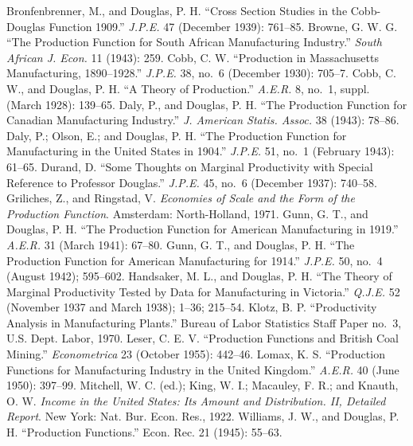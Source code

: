 \documentclass{article}
\begin{document}
\begin{thebibliography}{00}
Bronfenbrenner, M., and Douglas, P. H. \foreignlanguage{english}{``Cross Section Studies in the Cobb-Douglas Function 1909.'' \emph{J.P.E.} 47 (December 1939): 761--85.}
Browne, G. W. G. \foreignlanguage{english}{``The Production Function for South African Manufacturing Industry.'' \emph{South African J. Econ.} 11 (1943): 259.}
Cobb, C. W. \foreignlanguage{english}{``Production in Massachusetts Manufacturing, 1890--1928.'' \emph{J.P.E.} 38, no.~6 (December 1930): 705--7.}
Cobb, C. W., and Douglas, P. H. \foreignlanguage{english}{``A Theory of Production.'' \emph{A.E.R.} 8, no.~1, suppl. (March 1928): 139--65.}
Daly, P., and Douglas, P. H. \foreignlanguage{english}{``The Production Function for Canadian Manufacturing Industry.'' \emph{J. American Statis. Assoc.} 38 (1943): 78--86.}
Daly, P.; Olson, E.; and Douglas, P. H. \foreignlanguage{english}{``The Production Function for Manufacturing in the United States in 1904.'' \emph{J.P.E.} 51, no.~1 (February 1943): 61--65.}
Durand, D. \foreignlanguage{english}{``Some Thoughts on Marginal Productivity with Special Reference to Professor Douglas.'' \emph{J.P.E.} 45, no.~6 (December 1937): 740--58.}
Griliches, Z., and Ringstad, V. \foreignlanguage{english}{\emph{Economies of Scale and the Form of the Production Function}. Amsterdam: North-Holland, 1971.}
Gunn, G. T., and Douglas, P. H. \foreignlanguage{english}{``The Production Function for American Manufacturing in 1919.'' \emph{A.E.R.} 31 (March 1941): 67--80.}
Gunn, G. T., and Douglas, P. H. \foreignlanguage{english}{``The Production Function for American Manufacturing for 1914.'' \emph{J.P.E.} 50, no.~4 (August 1942); 595--602.}
Handsaker, M. L., and Douglas, P. H. \foreignlanguage{english}{``The Theory of Marginal Productivity Tested by Data for Manufacturing in Victoria.'' \emph{Q.J.E.} 52 (November 1937 and March 1938); 1--36; 215--54.}
Klotz, B. P. \foreignlanguage{english}{``Productivity Analysis in Manufacturing Plants.'' Bureau of Labor Statistics Staff Paper no.~3, U.S. Dept. Labor, 1970.}
Leser, C. E. V. \foreignlanguage{english}{``Production Functions and British Coal Mining.'' \emph{Econometrica} 23 (October 1955): 442--46.}
Lomax, K. S. \foreignlanguage{english}{``Production Functions for Manufacturing Industry in the United Kingdom.'' \emph{A.E.R.} 40 (June 1950): 397--99.}
Mitchell, W. C. (ed.); King, W. I.; Macauley, F. R.; and Knauth, O. W. \foreignlanguage{english}{\emph{Income in the United States: Its Amount and Distribution. II, Detailed Report}. New York: Nat. Bur. Econ. Res., 1922.}
Williams, J. W., and Douglas, P. H. \foreignlanguage{english}{``Production Functions.'' Econ. Rec. 21 (1945): 55--63.}

\end{thebibliography}
\end{document}
